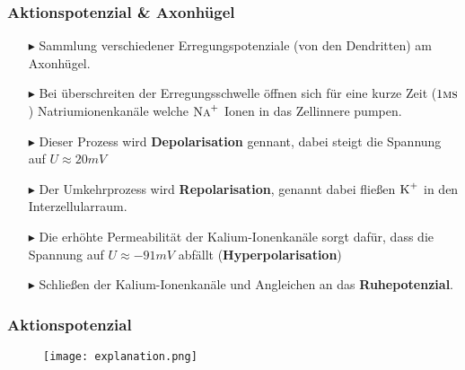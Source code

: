 \documentclass[ngerman]{beamer}
\begin{document}


\begin{frame}\frametitle{ Aktionspotenzial \& Axonhügel}
\begin{itemize}

\item[$\blacktriangleright$] Sammlung verschiedener Erregungspotenziale (von den Dendritten) am Axonhügel.

\item[$\blacktriangleright$] Bei überschreiten der Erregungsschwelle öffnen sich für eine kurze Zeit ($ 1\textsc{ms} $) Natriumionenkanäle welche $ \textsc{Na}^{+} $ Ionen in das Zellinnere pumpen.

\item[$\blacktriangleright$] Dieser Prozess wird \textbf{Depolarisation} gennant, dabei steigt die Spannung auf $U \approx 20 \textit{mV}$ 

\item[$\blacktriangleright$] Der Umkehrprozess wird \textbf{Repolarisation}, genannt dabei fließen $ \textsc{K}^{+} $ in den Interzellularraum.

\item[$\blacktriangleright$] Die erhöhte Permeabilität der Kalium-Ionenkanäle sorgt dafür, dass die Spannung auf $U \approx -91 \textit{mV}$ abfällt (\textbf{Hyperpolarisation})

\item[$\blacktriangleright$] Schließen der Kalium-Ionenkanäle und Angleichen an das \textbf{Ruhepotenzial}.

\end{itemize}
\end{frame}


\begin{frame}\frametitle{  Aktionspotenzial }

\begin{figure}[h]
	\centering
	\texttt{[image: explanation.png]}
\end{figure}

\end{frame}

\end{document}
